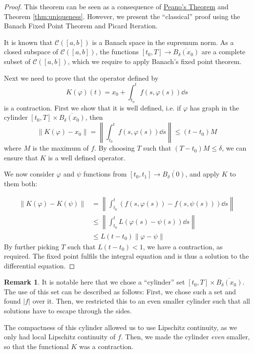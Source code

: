 \documentclass[prb,12pt]{revtex4-2}
\theoremstyle{definition}
\newtheorem{Remark}[Theorem]{Remark}
\theoremstyle{definition}
\theoremstyle{definition}
\begin{document}
\begin{proof}
	This theorem can be seen as a consequence of \hyperref[thm:peano]{Peano's Theorem} and Theorem \ref{thm:uniqueness}. However, we present the ``classical'' proof using the Banach Fixed Point Theorem and Picard Iteration.
	
	It is known that $\mathcal{C}([a,b])$ is a Banach space in the supremum norm. As a closed subspace of $\mathcal{C}([a,b])$, the functions $[t_0,T]\to \overline{B_\delta(x_0)}$ are a complete subset of $\mathcal{C}([a,b])$, which we require to apply Banach's fixed point theorem.
	
	Next we need to prove that the operator defined by
	\[K(\varphi)(t) = x_0+\int_{t_0}^t f(s, \varphi(s))\dd{s}\]
	is a contraction. First we show that it is well defined, i.e. if $\varphi$ has graph in the cylinder $[t_0, T]\times \overline{B_{\delta}(x_0)}$, then
	\[\|K(\varphi)-x_0\|=\left\| \int_{t_0}^t f(s, \varphi(s))\dd{s}\right\|\le (t-t_0)M\] 
	where $M$ is the maximum of $f$. By choosing $T$ such that $(T-t_0)M\le \delta$, we can ensure that $K$ is a well defined operator.
	
	We now consider $\varphi$ and $\psi$ functions from $[t_0,t_1]\to \overline{B_{\delta}(0)}$, and apply $K$ to them both:
	
	\begin{align*}
		\|K(\varphi) - K(\psi)\| &= \left\| \int_{t_0}^t (f(s, \varphi(s)) - f(s, \psi(s)))\dd{s}\right\|\\
		&\le \left\|\int_{t_0}^t L(\varphi(s) -\psi(s))\dd{s}\right\|\\
		&\le L(t-t_0)\|\varphi-\psi\|
	\end{align*}
	By further picking $T$ such that $L(t-t_0)< 1$, we have a contraction, as required. The fixed point fulfils the integral equation and is thus a solution to the differential equation.
\end{proof}
\begin{Remark}
	It is notable here that we chose a ``cylinder'' set $[t_0,T]\times \overline{B_\delta(x_0)}$. The use of this set can be described as follows: First, we chose such a set and found $|f|$ over it. Then, we restricted this to an even smaller cylinder such that all solutions have to escape through the sides. 
	
	The compactness of this cylinder allowed us to use Lipschitz continuity, as we only had local Lipschitz continuity of $f$. Then, we made the cylinder \emph{even} smaller, so that the functional $K$ was a contraction.
\end{Remark}
\end{document}
